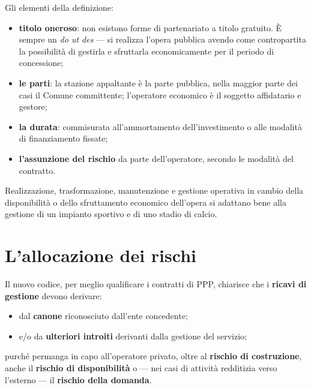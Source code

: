 Gli elementi della definizione:

\begin{itemize}
  \item \textbf{titolo oneroso}: non esistono forme di partenariato a titolo gratuito. È sempre un
    \textit{do ut des} --- si realizza l'opera pubblica avendo come contropartita la possibilità di
    gestirla e sfruttarla economicamente per il periodo di concessione;
  \item \textbf{le parti}: la stazione appaltante è la parte pubblica, nella maggior parte dei casi
    il Comune committente; l'operatore economico è il soggetto affidatario e gestore;
  \item \textbf{la durata}: commisurata all'ammortamento dell'investimento o alle modalità di
    finanziamento fissate;
  \item \textbf{l'assunzione del rischio} da parte dell'operatore, secondo le modalità del
    contratto.
\end{itemize}

Realizzazione, trasformazione, manutenzione e gestione operativa in cambio della disponibilità o
dello sfruttamento economico dell'opera si adattano bene alla gestione di un impianto sportivo e
di uno stadio di calcio.


\section{L'allocazione dei rischi}


Il nuovo codice, per meglio qualificare i contratti di PPP, chiarisce che i \textbf{ricavi di
gestione} devono derivare:

\begin{itemize}
  \item dal \textbf{canone} riconosciuto dall'ente concedente;
  \item e/o da \textbf{ulteriori introiti} derivanti dalla gestione del servizio;
\end{itemize}

purché permanga in capo all'operatore privato, oltre al \textbf{rischio di costruzione}, anche il
\textbf{rischio di disponibilità} o --- nei casi di attività redditizia verso l'esterno --- il
\textbf{rischio della domanda}.

